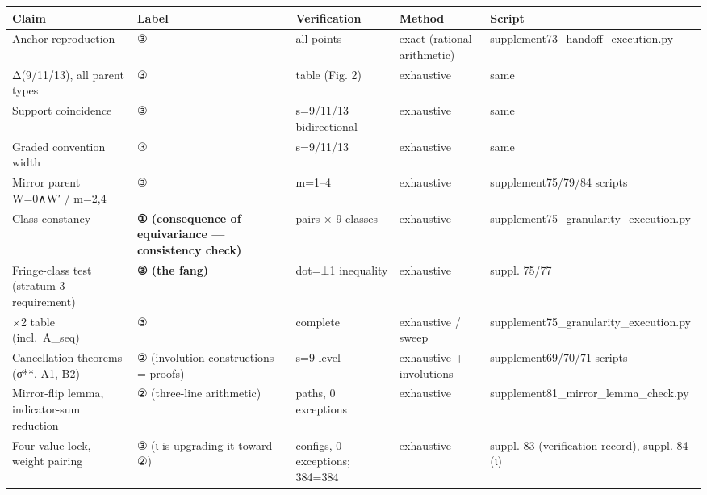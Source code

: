 \documentclass[
]{article}
\newcounter{none} %
\begin{document}
{\def\LTcaptype{none} %
\begin{longtable}[]{@{}
  >{\raggedright\arraybackslash}p{}
  >{\raggedright\arraybackslash}p{}
  >{\raggedright\arraybackslash}p{}
  >{\raggedright\arraybackslash}p{}
  >{\raggedright\arraybackslash}p{}@{}}
\toprule\noalign{}
\begin{minipage}[b]{\linewidth}\raggedright
Claim
\end{minipage} & \begin{minipage}[b]{\linewidth}\raggedright
Label
\end{minipage} & \begin{minipage}[b]{\linewidth}\raggedright
Verification
\end{minipage} & \begin{minipage}[b]{\linewidth}\raggedright
Method
\end{minipage} & \begin{minipage}[b]{\linewidth}\raggedright
Script
\end{minipage} \\
\midrule\noalign{}
\endhead
\bottomrule\noalign{}
\endlastfoot
Anchor reproduction & ③ & all points & exact (rational arithmetic) &
supplement73\_handoff\_execution.py \\
Δ(9/11/13), all parent types & ③ & table (Fig. 2) & exhaustive & same \\
Support coincidence & ③ & s=9/11/13 bidirectional & exhaustive & same \\
Graded convention width & ③ & s=9/11/13 & exhaustive & same \\
Mirror parent W=0∧W′ / m=2,4 & ③ & m=1--4 & exhaustive &
supplement75/79/84 scripts \\
Class constancy & \textbf{① (consequence of equivariance --- consistency
check)} & 23 pairs × 9 classes & exhaustive &
supplement75\_granularity\_execution.py \\
Fringe-class test (stratum-3 requirement) & \textbf{③ (the fang)} &
dot=±1 inequality & exhaustive & suppl. 75/77 \\
2×2 table (incl.~A\_seq) & ③ & complete & exhaustive / sweep &
supplement75\_granularity\_execution.py \\
Cancellation theorems (σ**, A1, B2) & ② (involution constructions =
proofs) & s=9 level & exhaustive + involutions & supplement69/70/71
scripts \\
Mirror-flip lemma, indicator-sum reduction & ② (three-line arithmetic) &
394 paths, 0 exceptions & exhaustive &
supplement81\_mirror\_lemma\_check.py \\
Four-value lock, weight pairing & ③ (ι is upgrading it toward ②) & 36
configs, 0 exceptions; 384=384 & exhaustive & suppl. 83 (verification
record), suppl. 84 (ι) \\
\end{longtable}
}
\end{document}
